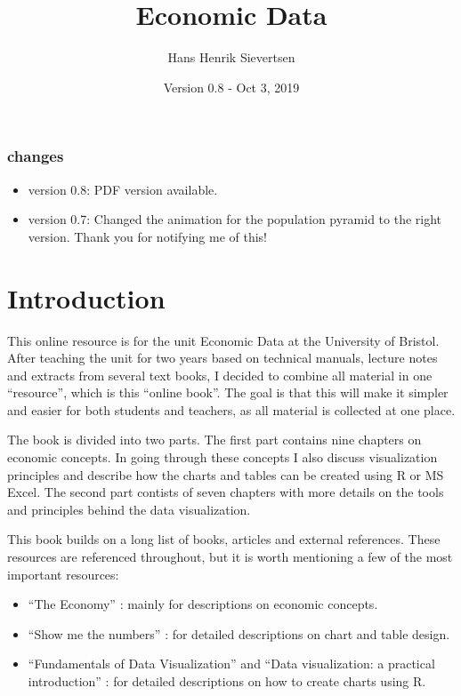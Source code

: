 \documentclass[]{book}
\title{Economic Data}
\author{Hans Henrik Sievertsen}
\date{Version 0.8 - Oct 3, 2019}
\providecommand{\tightlist}{%
  \setlength{\itemsep}{0pt}\setlength{\parskip}{0pt}}
\begin{document}
\maketitle

{
\setcounter{tocdepth}{1}
\tableofcontents
}
\hypertarget{changes}{%
\subsection*{changes}\label{changes}}

\begin{itemize}
\item
  version 0.8: PDF version available. 
\item
  version 0.7: Changed the animation for the population pyramid to the right version. Thank you for notifying me of this! 
\end{itemize}

\hypertarget{introduction}{%
\chapter*{Introduction}\label{introduction}}

This online resource is for the unit Economic Data at the University of Bristol. After teaching the unit for two years based on technical manuals, lecture notes and extracts from several text books, I decided to combine all material in one ``resource'', which is this ``online book''. The goal is that this will make it simpler and easier for both students and teachers, as all material is collected at one place.

The book is divided into two parts. The first part contains nine chapters on economic concepts. In going through these concepts I also discuss visualization principles and describe how the charts and tables can be created using R or MS Excel. The second part contists of seven chapters with more details on the tools and principles behind the data visualization.

This book builds on a long list of books, articles and external references. These resources are referenced throughout, but it is worth mentioning a few of the most important resources:

\begin{itemize}
\tightlist
\item
  ``The Economy'' \citep{core}: mainly for descriptions on economic concepts.
\item
  ``Show me the numbers'' \citep{few2012show}: for detailed descriptions on chart and table design.
\item
  ``Fundamentals of Data Visualization'' \citep{wilke2019fundamentals} and ``Data visualization: a practical introduction'' \citep{healy2018data}: for detailed descriptions on how to create charts using R.
\end{itemize}
\end{document}
